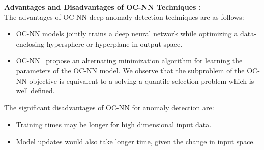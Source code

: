 \textbf{Advantages and Disadvantages of OC-NN Techniques :}\\
The advantages of OC-NN deep anomaly detection techniques are as follows:
\begin{itemize}
\item  OC-NN  models jointly trains a deep neural network while optimizing a data-enclosing hypersphere or hyperplane in output space.
\item OC-NN~\cite{chalapathy2018anomaly} propose an alternating minimization algorithm for learning
the parameters of the OC-NN model. We observe that the subproblem of the OC-NN objective is equivalent to a solving a quantile selection problem which is well defined.
\end{itemize}
The significant disadvantages of OC-NN for anomaly detection are:
\begin{itemize}
\item Training times may be longer for high dimensional input data.
\item Model updates would also take longer time, given the change in input space.
\end{itemize}


